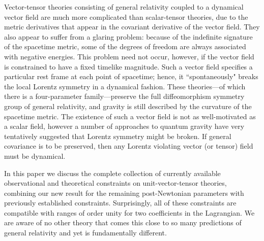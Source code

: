 \documentclass[aps,prd,preprint,amsmath,amssymb]{revtex4}
\begin{document}
Vector-tensor theories consisting of general relativity coupled to
a dynamical vector field are much more complicated than
scalar-tensor theories, due to the metric derivatives that appear
in the covariant derivative of the vector field.
They also appear
to suffer from a glaring problem: because of the indefinite
signature of the spacetime metric, some of the degrees of freedom
are always associated with negative energies.
This problem need not occur, however, if the vector
field is constrained to have a fixed timelike magnitude.
Such a vector field specifies a
particular rest frame at each point of spacetime; hence, it
``spontaneously" breaks the local Lorentz symmetry in a dynamical
fashion. These theories---of which there is a four-parameter
family---preserve the full diffeomorphism
symmetry group of general relativity,
and gravity is still described by the
curvature of the spacetime metric. The
existence of such a vector field is not as well-motivated
as a scalar field, however a number of approaches to
quantum gravity have very tentatively suggested that
Lorentz symmetry might be broken. If general covariance
is to be preserved, then any Lorentz violating vector (or tensor)
field must be dynamical.

In this paper we discuss the complete collection of currently
available observational and theoretical constraints on
unit-vector-tensor theories, combining our new result for the
remaining post-Newtonian parameters with previously established
constraints. Surprisingly, all of these constraints are compatible
with ranges of order unity for two coefficients in the Lagrangian.
We are aware of no other theory that comes this close to so many
predictions of general relativity and yet is fundamentally
different.
\end{document}
